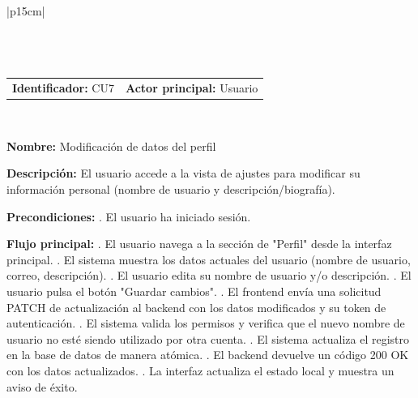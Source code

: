 \begingroup
{}
\setlength{\arrayrulewidth}{1pt}
\begin{longtable}{|p{15cm}|}
  \hline
   \\
  \hline
  \endfirsthead
   \\
  \hline
   \\
  \hline
  \endhead
  \hline {} \\ \hline
  \endfoot
  \hline
  \caption{Caso de uso 7 — Modificación de datos del perfil.}
  \label{TB:CU7_PERFIL_DATOS}
  \endlastfoot

  \begin{tabularx}{\linewidth}{@{}X X@{}}
    \textbf{Identificador:} CU7 & \textbf{Actor principal:} Usuario
  \end{tabularx} \\ \hline

  \textbf{Nombre:} Modificación de datos del perfil \\ \hline

  \textbf{Descripción:} \newline 
  El usuario accede a la vista de ajustes para modificar su información personal (nombre de usuario y descripción/biografía). \\ \hline

  \textbf{Precondiciones:} . El usuario ha iniciado sesión. \\ \hline

  \textbf{Flujo principal:} . El usuario navega a la sección de "Perfil" desde la interfaz principal. . El sistema muestra los datos actuales del usuario (nombre de usuario, correo, descripción). . El usuario edita su nombre de usuario y/o descripción. . El usuario pulsa el botón "Guardar cambios". . El frontend envía una solicitud PATCH de actualización al backend con los datos modificados y su token de autenticación. . El sistema valida los permisos y verifica que el nuevo nombre de usuario no esté siendo utilizado por otra cuenta. . El sistema actualiza el registro en la base de datos de manera atómica. . El backend devuelve un código 200 OK con los datos actualizados. . La interfaz actualiza el estado local y muestra un aviso de éxito. \\ \hline


\end{longtable}
